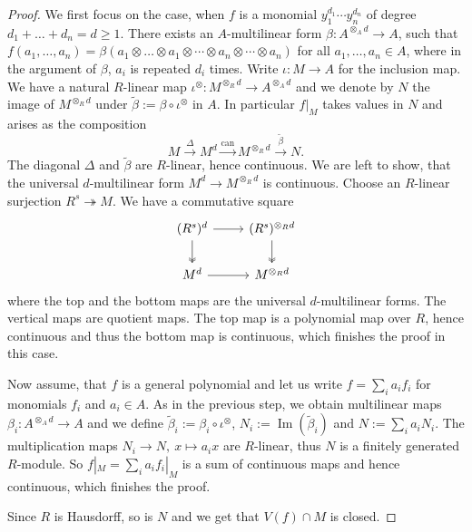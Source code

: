 \documentclass{amsart}
\theoremstyle{definition}
\theoremstyle{remark}
\DeclareMathOperator{\Image}{Im}
\begin{document}
\begin{proof}
    We first focus on the case, when $f$ is a monomial $y_1^{d_1} \cdots y_n^{d_n}$ of degree $d_1 + \dots + d_n= d \geq 1$.
    There exists an $A$-multilinear form $\beta : A^{\otimes_A d} \to A$, such that $f(a_1, \dots, a_n) = \beta(a_1 \otimes \dots \otimes a_1 \otimes \cdots \otimes a_n \otimes \cdots \otimes a_n)$ for all $a_1, \dots, a_n \in A$, where in the argument of $\beta$, $a_i$ is repeated $d_i$ times.
    Write $\iota : M \to A$ for the inclusion map.
    We have a natural $R$-linear map $\iota^{\otimes} : M^{\otimes_R d} \to A^{\otimes_A d}$ and we denote by $N$ the image of $M^{\otimes_R d}$ under 
    $\tilde\beta:= \beta \circ \iota^{\otimes}$ in $A$.
    In particular $f|_M$ takes values in $N$ and arises as the composition
    $$ M \xrightarrow{\Delta} M^d \xrightarrow{\mathrm{can}} M^{\otimes_R d} \xrightarrow{\tilde\beta} N. $$
    The diagonal $\Delta$ and $\tilde\beta$ are $R$-linear, hence continuous.
    We are left to show, that the universal $d$-multilinear form $M^d \to M^{\otimes_R d}$ is continuous.
    Choose an $R$-linear surjection $R^s \twoheadrightarrow M$. We have a commutative square
    \begin{equation}
    \begin{tikzcd}
        (R^s)^d \rar \dar[twoheadrightarrow] & (R^s)^{\otimes_R d} \dar[twoheadrightarrow] \\
        M^d \rar & M^{\otimes_R d}
    \end{tikzcd}
    \end{equation}
    where the top and the bottom maps are the universal $d$-multilinear forms. The vertical maps are quotient maps.
    The top map is a polynomial map over $R$, hence continuous and thus the bottom map is continuous, which finishes the proof in this case.

    Now assume, that $f$ is a general polynomial and let us write $f = \sum_i a_i f_i$ for monomials $f_i$ and $a_i \in A$.
    As in the previous step, we obtain multilinear maps $\beta_i : A^{\otimes_A d} \to A$ and we define $\tilde \beta_i := \beta_i \circ \iota^{\otimes}$, $N_i := \Image(\tilde \beta_i)$ and $N := \sum_i a_iN_i$. The multiplication maps $N_i \to N, ~x \mapsto a_ix$ are $R$-linear, thus $N$ is a finitely generated $R$-module. So $f|_M = \sum_i a_i f_i|_M$ is a sum of continuous maps and hence continuous, which finishes the proof.
    
    Since $R$ is Hausdorff, so is $N$ and  we get that $V(f) \cap M$ is closed.
\end{proof}
\end{document}
